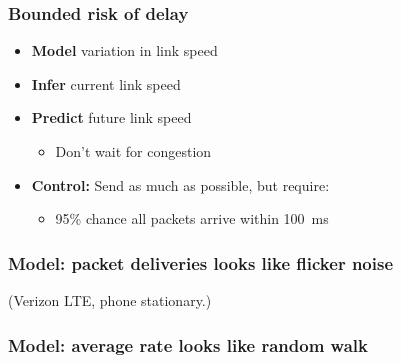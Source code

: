 \documentclass[svgnames]{beamer}
\begin{document}
\begin{frame}
\frametitle{Bounded risk of delay}
\begin{itemize}

\large

\item \textbf{Model} variation in link speed

\item \textbf{Infer} current link speed

\item \textbf{Predict} future link speed

\begin{itemize}
\item Don't wait for congestion
\end{itemize}

\item \textbf{Control:} Send as much as possible, but require:

\begin{itemize}

\item 95\% chance all packets arrive within 100~ms

\end{itemize}

\end{itemize}

\end{frame}

\begin{frame}
\frametitle{\textbf{Model}: packet deliveries looks like flicker noise}

\begin{centering}

\def\svgwidth{0.7 \columnwidth}

\end{centering}

{\small (Verizon LTE, phone stationary.)}

\end{frame}

\begin{frame}
\frametitle{\textbf{Model}: average rate looks like random walk}

\begin{centering}

{\small
\def\svgwidth{\columnwidth}
}

\end{centering}

\end{frame}
\end{document}
